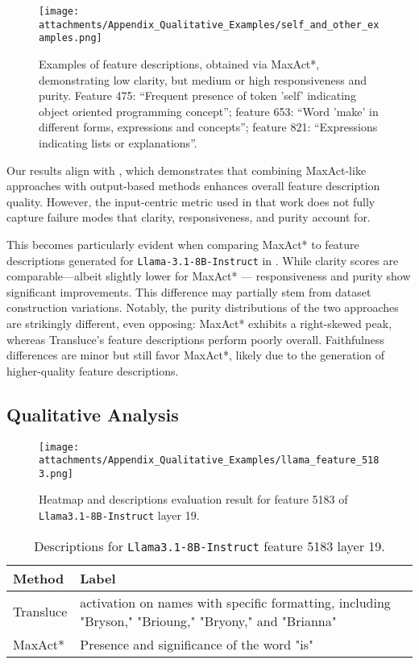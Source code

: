 \begin{figure*}
    \centering
    \texttt{[image: attachments/Appendix\_Qualitative\_Examples/self\_and\_other\_examples.png]}
    \caption{Examples of feature descriptions, obtained via MaxAct*, demonstrating low clarity, but medium or high responsiveness and purity. Feature 475: ``Frequent presence of token 'self' indicating object oriented programming concept''; feature 653: ``Word 'make' in different forms, expressions and concepts''; feature 821: ``Expressions indicating lists or explanations''. }
    \label{fig:low-calrity-heatmaps}
\end{figure*}

Our results align with \cite{gurarieh2025enhancingautomatedinterpretabilityoutputcentric}, which demonstrates that combining MaxAct-like approaches with output-based methods enhances overall feature description quality. However, the input-centric metric used in that work does not fully capture failure modes that clarity, responsiveness, and purity account for.

This becomes particularly evident when comparing MaxAct* to feature descriptions generated for \texttt{Llama-3.1-8B-Instruct} in \cite{choi2024automatic}. While clarity scores are comparable—albeit slightly lower for MaxAct* --- responsiveness and purity show significant improvements. This difference may partially stem from dataset construction variations. Notably, the purity distributions of the two approaches are strikingly different, even opposing: MaxAct* exhibits a right-skewed peak, whereas Transluce’s feature descriptions perform poorly overall. Faithfulness differences are minor but still favor MaxAct*, likely due to the generation of higher-quality feature descriptions.

\subsection{Qualitative Analysis}

\begin{figure}[t]
    \centering
    \texttt{[image: attachments/Appendix\_Qualitative\_Examples/llama\_feature\_5183.png]}
    \caption{Heatmap and descriptions evaluation result for feature 5183 of \texttt{Llama3.1-8B-Instruct} layer 19.}
    \label{fig:feature-5183}
\end{figure}

\begin{table}[t]
\scriptsize
\centering
\begin{tabular}{p{1.5cm}p{5.5cm}}
Method & Label  \\ \hline \hline
Transluce & activation on names with specific formatting, including "Bryson," "Brioung," "Bryony," and "Brianna"  \\ 
MaxAct* & Presence and significance of the word "is" \\ \hline
\end{tabular}
\caption{Descriptions for \texttt{Llama3.1-8B-Instruct} feature 5183 layer 19.}
\label{tab:feature-5183}
\end{table}



